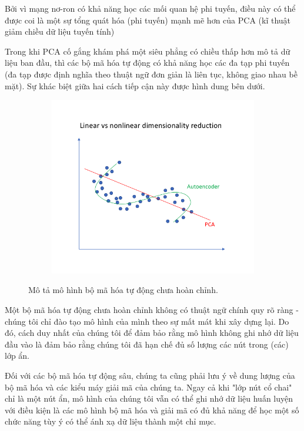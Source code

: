 Bởi vì mạng nơ-ron có khả năng học các mối quan hệ phi tuyến,
điều này có thể được coi là một sự tổng quát hóa (phi tuyến)
mạnh mẽ hơn của PCA (kĩ thuật giảm chiều dữ liệu tuyến tính)

\newpage
Trong khi PCA cố gắng khám phá một siêu phẳng có chiều thấp hơn
mô tả dữ liệu ban đầu, thì các bộ mã hóa tự động có khả năng học các
đa tạp phi tuyến (đa tạp được định nghĩa theo thuật ngữ đơn giản
là liên tục, không giao nhau bề mặt). Sự khác biệt giữa hai cách
tiếp cận này được hình dung bên dưới.

\begin{figure}
    \begin{subfigure}{0.5\textwidth}
        \includegraphics[width=1.\linewidth]{Chapters/items/auto3.jpg}
         
        \label{fig: auto3}
    \end{subfigure}
    \caption{Mô tả mô hình bộ mã hóa tự động chưa hoàn chỉnh.}
\end{figure}

Một bộ mã hóa tự động chưa hoàn chỉnh không có thuật ngữ chính quy
rõ ràng - chúng tôi chỉ đào tạo mô hình của mình theo sự mất mát
khi xây dựng lại. Do đó, cách duy nhất của chúng tôi để đảm bảo rằng
mô hình không ghi nhớ dữ liệu đầu vào là đảm bảo rằng chúng tôi đã
hạn chế đủ số lượng các nút trong (các) lớp ẩn.

Đối với các bộ mã hóa tự động sâu, chúng ta cũng phải lưu ý về dung
lượng của bộ mã hóa và các kiểu máy giải mã của chúng ta.
Ngay cả khi "lớp nút cổ chai" chỉ là một nút ẩn, mô hình của
chúng tôi vẫn có thể ghi nhớ dữ liệu huấn luyện với điều kiện là
các mô hình bộ mã hóa và giải mã có đủ khả năng để học một số chức
năng tùy ý có thể ánh xạ dữ liệu thành một chỉ mục.


